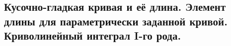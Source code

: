 \subsection{Кусочно-гладкая кривая и её длина. Элемент длины для параметрически заданной кривой. Криволинейный интеграл I-го рода.}